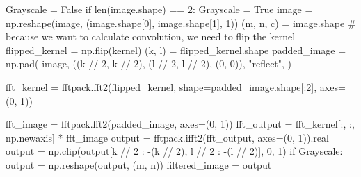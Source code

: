 \begin{enumerate}
\begin{python}
Grayscale = False
if len(image.shape) == 2:
    Grayscale = True
    image = np.reshape(image, (image.shape[0], image.shape[1], 1))
(m, n, c) = image.shape
# because we want to calculate convolution, we need to flip the kernel
flipped_kernel = np.flip(kernel)
(k, l) = flipped_kernel.shape
padded_image = np.pad(
    image, ((k // 2, k // 2), (l // 2, l // 2), (0, 0)), "reflect",
)

fft_kernel = fftpack.fft2(flipped_kernel, shape=padded_image.shape[:2], axes=(0, 1))

fft_image = fftpack.fft2(padded_image, axes=(0, 1))
fft_output = fft_kernel[:, :, np.newaxis] * fft_image
output = fftpack.ifft2(fft_output, axes=(0, 1)).real
output = np.clip(output[k // 2 : -(k // 2), l // 2 : -(l // 2)], 0, 1)
if Grayscale:
    output = np.reshape(output, (m, n))
filtered_image = output
        \end{python} 
\end{enumerate}


